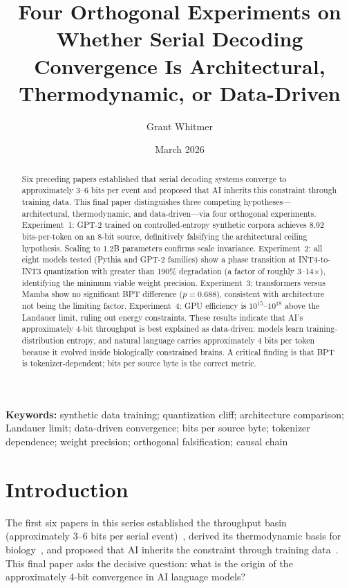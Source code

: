 \documentclass[11pt]{article}
\title{Four Orthogonal Experiments on Whether Serial Decoding Convergence Is Architectural, Thermodynamic, or Data-Driven}
\author{Grant Whitmer}
\date{March 2026}
\begin{document}
\maketitle

\begin{abstract}
Six preceding papers established that serial decoding systems converge to approximately 3--6 bits per event and proposed that AI inherits this constraint through training data. This final paper distinguishes three competing hypotheses---architectural, thermodynamic, and data-driven---via four orthogonal experiments. Experiment~1: GPT-2 trained on controlled-entropy synthetic corpora achieves 8.92 bits-per-token on an 8-bit source, definitively falsifying the architectural ceiling hypothesis. Scaling to 1.2B parameters confirms scale invariance. Experiment~2: all eight models tested (Pythia and GPT-2 families) show a phase transition at INT4-to-INT3 quantization with greater than 190\% degradation (a factor of roughly 3--14$\times$), identifying the minimum viable weight precision. Experiment~3: transformers versus Mamba show no significant BPT difference ($p = 0.688$), consistent with architecture not being the limiting factor. Experiment~4: GPU efficiency is $10^{15}$--$10^{18}$ above the Landauer limit, ruling out energy constraints. These results indicate that AI's approximately 4-bit throughput is best explained as data-driven: models learn training-distribution entropy, and natural language carries approximately 4 bits per token because it evolved inside biologically constrained brains. A critical finding is that BPT is tokenizer-dependent; bits per source byte is the correct metric.
\end{abstract}

\noindent\textbf{Keywords:} synthetic data training; quantization cliff; architecture comparison; Landauer limit; data-driven convergence; bits per source byte; tokenizer dependence; weight precision; orthogonal falsification; causal chain

\section{Introduction}

The first six papers in this series established the throughput basin (approximately 3--6 bits per serial event)~\cite{whitmer2026fons,whitmer2026floor,whitmer2026basin,whitmer2026serial,whitmer2026dissipative}, derived its thermodynamic basis for biology~\cite{whitmer2026serial,whitmer2026dissipative}, and proposed that AI inherits the constraint through training data~\cite{whitmer2026inherited}. This final paper asks the decisive question: what is the origin of the approximately 4-bit convergence in AI language models?
\end{document}
